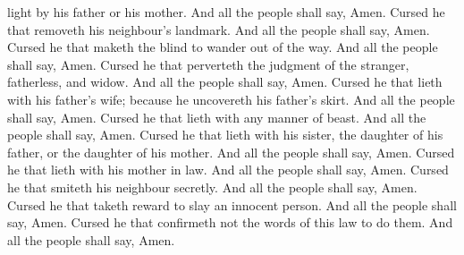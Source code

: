 {light by his
father or his
mother. And all the
people shall
say,
Amen.
Cursed
{} he that
removeth his
neighbour’s
landmark. And all the
people shall
say,
Amen.
Cursed
{} he that maketh the
blind to
wander out of the
way. And all the
people shall
say,
Amen.
Cursed
{} he that
perverteth the
judgment of the
stranger,
fatherless, and
widow. And all the
people shall
say,
Amen.
Cursed
{} he that
lieth with his
father’s
wife; because he
uncovereth his
father’s
skirt. And all the
people shall
say,
Amen.
Cursed
{} he that
lieth with any manner of
beast. And all the
people shall
say,
Amen.
Cursed
{} he that
lieth with his
sister, the
daughter of his
father, or the
daughter of his
mother. And all the
people shall
say,
Amen.
Cursed
{} he that
lieth with his mother in
law. And all the
people shall
say,
Amen.
Cursed
{} he that
smiteth his
neighbour
secretly. And all the
people shall
say,
Amen.
Cursed
{} he that
taketh
reward to
slay an
innocent
person. And all the
people shall
say,
Amen.
Cursed
{} he that
confirmeth not
{} the
words of this
law to
do them. And all the
people shall
say,
Amen.

}

